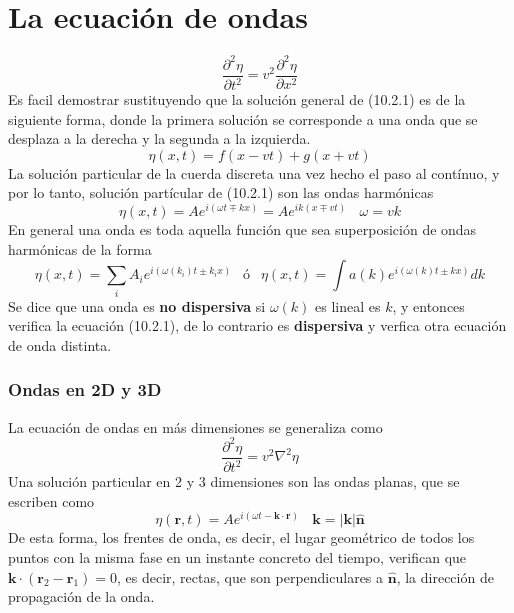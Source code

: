 \section{La ecuación de ondas}
\vspace{-20pt}
\begin{equation} \label{6.1.1}
    \frac{\partial^2 \eta}{\partial t^2} = v^2 \frac{\partial^2 \eta}{\partial x^2}
\end{equation}
Es facil demostrar sustituyendo que la solución general de (10.2.1) es de la siguiente forma, donde la primera solución se corresponde a una onda que se desplaza a la derecha y la segunda a la izquierda.
\begin{equation} \label{6.1.1}
    \eta(x,t) = f(x-vt) + g(x+vt)
\end{equation}
La solución particular de la cuerda discreta una vez hecho el paso al contínuo, y por lo tanto, solución partícular de (10.2.1) son las ondas harmónicas
\begin{equation} \label{6.1.1}
    \eta(x,t) = A e^{i(\omega t \mp k x)} = A e^{ ik (x \mp vt)}  \ \ \ \ \omega = vk
\end{equation}
En general una onda es toda aquella función que sea superposición de ondas harmónicas de la forma
\begin{equation} \label{6.1.1}
    \eta(x,t) = \sum_i A_i e^{i(\omega(k_i) t \pm k_i x)} \ \ \mbox{  ó  } \ \ \eta(x,t) = \int a(k) e^{i(\omega(k) t \pm k x)}dk
\end{equation}
Se dice que una onda es \textbf{no dispersiva} si $\omega(k)$ es lineal es $k$, y entonces verifica la ecuación (10.2.1), de lo contrario es  \textbf{dispersiva} y verfica otra ecuación de onda distinta.
\subsubsection{Ondas en 2D y 3D}
La ecuación de ondas en más dimensiones se generaliza como
\begin{equation} \label{6.1.1}
    \frac{\partial^2 \eta}{\partial t^2} = v^2 \nabla^2 \eta
\end{equation}
Una solución particular en 2 y 3 dimensiones son las ondas planas, que se escriben como
\begin{equation} \label{6.1.1}
    \eta(\mathbf{r},t) = A e^{i(\omega t - \mathbf{k} \cdot \mathbf{r})}  \ \ \ \ \mathbf{k} = |\mathbf{k}| \hat{\mathbf{n}}
\end{equation}
De esta forma, los frentes de onda, es decir, el lugar geométrico de todos los puntos con la misma fase en un instante concreto del tiempo, verifican que $\mathbf{k}\cdot (\mathbf{r}_2-\mathbf{r}_1) = 0$, es decir, rectas, que son perpendiculares a $\hat{\mathbf{n}}$, la dirección de propagación de la onda.

